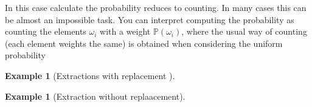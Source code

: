 \documentclass[12pt]{article}
\newtheorem{example}[theorem]{Example}
\newcommand{\<}{{\langle \!\! \langle}}
\renewcommand{\>}{{\rangle \!\! \rangle}}
\newcommand{\commento}[1]{
	\par\noindent
	\colorbox{light}{\begin{minipage}{120 mm}#1\end{minipage}}
	\par\noindent
}
\begin{document}
	\commento{In this case calculate the probability reduces to counting. In many cases this can be almost an impossible task. You can interpret computing the probability as counting the elements $\omega_i$ with a weight $\mathbb{P}(\omega_i)$, where the usual way of counting (each element weights the same) is obtained when considering the uniform probability}


	\begin{example}[Extractions with replacement ]
		
	\end{example}

	\begin{example}[Extraction without replaacement]

	
	\end{example}
\end{document}
